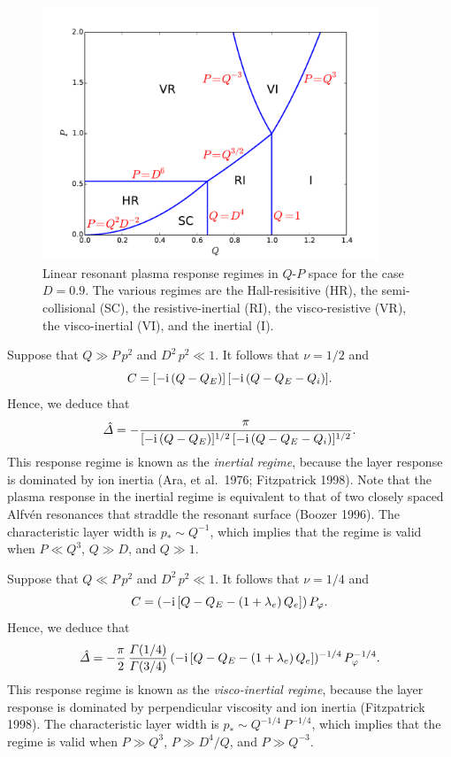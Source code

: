 \documentclass[notitlepage,12pt]{article}
\begin{document}
\begin{figure}
\centerline{\includegraphics[width=0.9\textwidth]{RegimeI.pdf}}
\caption{Linear resonant plasma response regimes in $Q$-$P$ space for the case $D=0.9$. The various regimes are
the Hall-resisitive (HR), the semi-collisional (SC), the resistive-inertial (RI), the visco-resistive (VR), the visco-inertial
(VI), and the inertial (I).}\label{f1}
\end{figure}

Suppose that $Q\gg P\,p^2$ and $D^2\,p^2 \ll 1$. It follows that $\nu=1/2$ and
\begin{equation}
C = [-{\rm i}\,(Q-Q_E)]\,[-{\rm i}\,(Q-Q_E-Q_i)].
\end{equation}
Hence, we deduce that
\begin{equation}
\hat{\mit\Delta} = -\frac{\pi}{[-{\rm i}\,(Q-Q_E)]^{1/2}\,[-{\rm i}\,(Q-Q_E-Q_i)]^{1/2}}.
\end{equation}
This response regime is known as the {\em inertial regime}, because the layer response is dominated by
 ion inertia (Ara, et al.\ 1976; Fitzpatrick 1998). Note that the plasma response in the inertial regime is
 equivalent to that of two closely spaced Alfv\'{e}n resonances that straddle the resonant surface (Boozer 1996). 
 The characteristic layer width is $p_\ast \sim Q^{-1}$,
which implies that the regime is valid when $P\ll Q^3$, $Q\gg D$, and $Q\gg 1$. 

Suppose that $Q\ll P\,p^2$ and $D^2\,p^2 \ll 1$. It follows that $\nu=1/4$ and
\begin{equation}
C = (-{\rm i}\,[Q-Q_E-(1+\lambda_e)\,Q_e])\,P_\varphi.
\end{equation}
Hence, we deduce that
\begin{equation}
\hat{\mit\Delta} =- \frac{\pi}{2}\,\frac{{\mit\Gamma}(1/4)}{{\mit\Gamma}(3/4)}\, (-{\rm i}\,[Q-Q_E-(1+\lambda_e)\,Q_e])^{-1/4}\,P_\varphi^{-1/4}.
\end{equation}
This response regime is known as the {\em visco-inertial regime}, because the layer response is dominated by
perpendicular viscosity and ion inertia (Fitzpatrick 1998). 
 The characteristic layer width is $p_\ast \sim Q^{-1/4}\,P^{-1/4}$,
which implies that the regime is valid when $P\gg Q^3$, $P\gg D^4/Q$, and $P\gg Q^{-3}$. 
\end{document}
